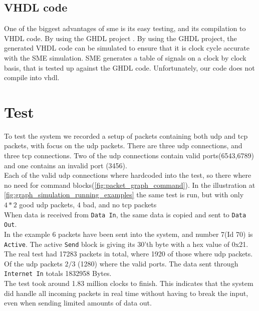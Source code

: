 \subsection{VHDL code}
One of the biggest advantages of \gls{sme} is its easy testing, and its
compilation to VHDL code. By using the GHDL project
\cite{github_ghdl}.
By using the GHDL project, the generated VHDL code can be simulated to ensure
that it is clock cycle accurate with the SME simulation. SME generates a table
of signals on a clock by clock basis, that is tested up against the GHDL code.
Unfortunately, our code does not compile into \gls{vhdl}.


\section{Test}
To test the system we recorded a setup of packets containing both \gls{udp} and
\gls{tcp} packets, with focus on the \gls{udp} packets. There are three
\gls{udp} connections, and three \gls{tcp} connections. Two of the \gls{udp}
connections contain valid ports(6543,6789) and one contains an invalid port (3456).\\
Each of the valid udp connections where hardcoded into the test, so there where no
need for command blocks(\autoref{fig:packet_graph_command}).
In the illustration at \autoref{fig:graph_simulation_running_examples} the
same test is run, but with only $4*2$ good \gls{udp} packets, $4$ bad, and
no \gls{tcp} packets\\
When data is received from \texttt{Data In}, the same data is copied and
sent to \texttt{Data Out}. \\
In the example 6 packets have been sent into the system, and number 7(Id 70)
is \texttt{Active}. The active \texttt{Send} block is giving its 30'th byte
with a hex value of 0x21.\\
The real test had 17283 packets in total, where 1920 of those where udp packets.
Of the udp packets $2/3$ (1280) where the valid ports. The data sent
through \texttt{Internet In} totals 1832958 Bytes.\\
The test took around 1.83 million clocks to finish. This indicates that the system
did handle all incoming packets in real time without having to break the input,
even when sending limited amounts of data out.




